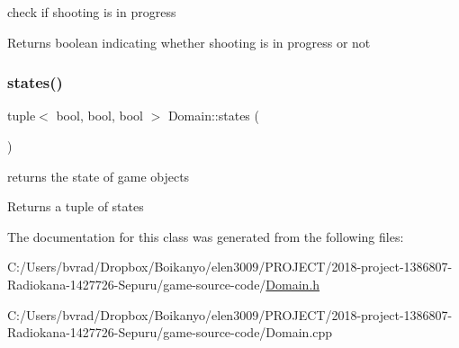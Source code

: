 check if shooting is in progress 

\begin{DoxyReturn}{Returns}
boolean indicating whether shooting is in progress or not 
\end{DoxyReturn}
\mbox{\label{class_domain_a28dd947d21159cbf30ec80b1d215772f}} 
\subsubsection{\texorpdfstring{states()}{states()}}
{\footnotesize\ttfamily tuple$<$ bool, bool, bool $>$ Domain\+::states (\begin{DoxyParamCaption}{ }\end{DoxyParamCaption})}



returns the state of game objects 

\begin{DoxyReturn}{Returns}
a tuple of states 
\end{DoxyReturn}


The documentation for this class was generated from the following files\+:\begin{DoxyCompactItemize}
\item 
C\+:/\+Users/bvrad/\+Dropbox/\+Boikanyo/elen3009/\+P\+R\+O\+J\+E\+C\+T/2018-\/project-\/1386807-\/\+Radiokana-\/1427726-\/\+Sepuru/game-\/source-\/code/\mbox{\hyperlink{_domain_8h}{Domain.\+h}}\item 
C\+:/\+Users/bvrad/\+Dropbox/\+Boikanyo/elen3009/\+P\+R\+O\+J\+E\+C\+T/2018-\/project-\/1386807-\/\+Radiokana-\/1427726-\/\+Sepuru/game-\/source-\/code/Domain.\+cpp\end{DoxyCompactItemize}
